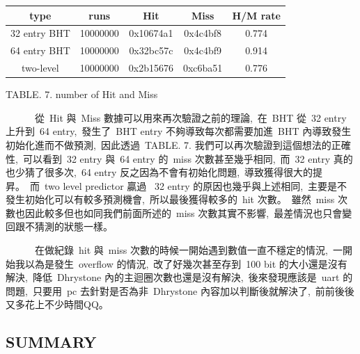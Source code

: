 \documentclass{article}
\begin{document}
\begin{CJK*}{UTF8}{bsmi}
\begin{multicols}{2}
\begin{flushleft}
    \begin{center}
        \begin{tabular}{||c c c c c ||} 
            \hline
            type & runs & Hit & Miss & H/M rate \\ [1.0ex] 
            \hline\hline
            32 entry BHT & 10000000 & 0x10674a1 & 0x4c4bf8 & 0.774\\ 
            \hline
            64 entry BHT & 10000000 & 0x32bc57c & 0x4c4bf9 & 0.914\\ 
            \hline
            two-level & 10000000 & 0x2b15676 & 0xc6ba51 & 0.776\\ 
            \hline
        \end{tabular}
    \end{center}
\end{flushleft}
\begin{center}
    \footnotesize TABLE. 7. number of Hit and Miss 
\end{center}

\begin{flushleft}
    \ \ \ \ \ \ 從\ Hit 與\ Miss 數據可以用來再次驗證之前的理論,\
    在\ BHT 從\ 32 entry 上升到\ 64 entry,\
    發生了\ BHT entry 不夠導致每次都需要加進\ BHT 內導致發生初始化進而不做預測,\
    因此透過\ TABLE. 7. 我們可以再次驗證到這個想法的正確性,\
    可以看到\ 32 entry 與\ 64 entry 的\ miss 次數甚至幾乎相同,\
    而\ 32 entry 真的也少猜了很多次,\ 64 entry 反之因為不會有初始化問題,\
    導致獲得很大的提昇。\
    而\ two level predictor 贏過 \ 32 entry 的原因也幾乎與上述相同,\
    主要是不發生初始化可以有較多預測機會,\
    所以最後獲得較多的\ hit 次數。\
    雖然\ miss 次數也因此較多但也如同我們前面所述的\ miss 次數其實不影響,\
    最差情況也只會變回跟不猜測的狀態一樣。\
\end{flushleft}

\begin{flushleft}
    \ \ \ \ \ \ 在做紀錄\ hit 與\ miss 次數的時候一開始遇到數值一直不穩定的情況,\
    一開始我以為是發生\ overflow 的情況,\
    改了好幾次甚至存到\ 100 bit 的大小還是沒有解決,\
    降低\ Dhrystone 內的主迴圈次數也還是沒有解決,\
    後來發現應該是\ uart 的問題,\
    只要用\ pc 去針對是否為非\ Dhrystone 內容加以判斷後就解決了,\
    前前後後又多花上不少時間QQ。
\end{flushleft}

\begin{center}
    \section*{SUMMARY}
\end{center}


\end{multicols}
\end{CJK*}
\end{document}
